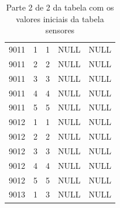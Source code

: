\documentclass[11pt,twoside,a4paper]{report}
\begin{document}
\begin{table}
\begin{tabular}{|l|l|l|l|l|}
		9011 & 1 & 1 & NULL & NULL\\ \cline{1-5}
		9011 & 2 & 2 & NULL & NULL\\ \cline{1-5}
		9011 & 3 & 3 & NULL & NULL\\ \cline{1-5}
		9011 & 4 & 4 & NULL & NULL\\ \cline{1-5}
		9011 & 5 & 5 & NULL & NULL\\ \cline{1-5}
		9012 & 1 & 1 & NULL & NULL\\ \cline{1-5}
		9012 & 2 & 2 & NULL & NULL\\ \cline{1-5}
		9012 & 3 & 3 & NULL & NULL\\ \cline{1-5}
		9012 & 4 & 4 & NULL & NULL\\ \cline{1-5}
		9012 & 5 & 5 & NULL & NULL\\ \cline{1-5}
		9013 & 1 & 3 & NULL & NULL\\ \cline{1-5}
	\end{tabular}
	\caption[Parte 2 de 2 da tabela com os valores iniciais da tabela sensores]{Parte 2 de 2 da tabela com os valores iniciais da tabela sensores}
	\label{tab:dados6}
\end{table}

\cleardoublepage
\end{document}
